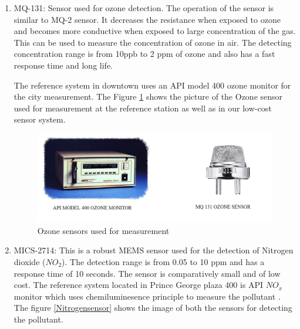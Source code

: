\begin{enumerate}

\item MQ-131: Sensor used for ozone detection. The operation of the sensor is similar to MQ-2 sensor. It decreases the resistance when exposed to ozone and becomes more conductive when exposed to large concentration of the gas. This can be used to measure the concentration of ozone in air. The detecting concentration range is from 10ppb to 2 ppm of ozone and also has a fast response time and long life. 

The reference system in downtown uses an API model 400 ozone monitor for the city measurement\cite{Environment2010}. The Figure \ref{Ozonesensor} shows the picture of the Ozone sensor used for measurement at the reference station as well as in our low-cost sensor system.
  
\begin{figure}[h]
  \begin{center}
  \includegraphics[scale=0.70]{images/figure30.png}
  \end{center}
  \caption{Ozone sensors used for measurement}
  \label{Ozonesensor}
\end{figure}
\hspace{1 cm}

\item MICS-2714: This is a robust MEMS sensor used for the detection of Nitrogen dioxide ($NO_2$). The detection range is from 0.05 to 10 ppm and has a response time of 10 seconds. The sensor is comparatively small and of low cost. The reference system located in Prince George plaza 400 is API $NO_{x}$ monitor \cite{Environment2010} which uses chemiluminesence principle to measure the pollutant . The figure \ref{Nitrogensensor} shows the image of both the sensors for detecting the pollutant.
  

\end{enumerate}
